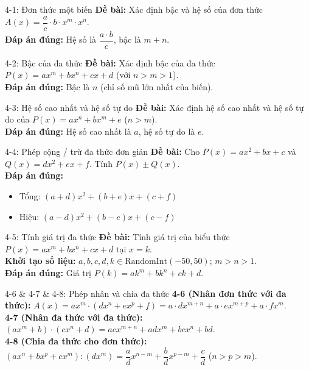 \documentclass[11pt, a4paper]{article}
\begin{document}
\begin{qbox}{4-1: Đơn thức một biến}
\textbf{Đề bài:} Xác định bậc và hệ số của đơn thức $A(x) = \dfrac{a}{c} \cdot b \cdot x^m \cdot x^n$. \\[0.3em]
\textbf{Đáp án đúng:} Hệ số là $\dfrac{a \cdot b}{c}$, bậc là $m + n$.
\end{qbox}

\begin{qbox}{4-2: Bậc của đa thức}
\textbf{Đề bài:} Xác định bậc của đa thức $P(x) = a x^m + b x^n + c x + d$ (với $n > m > 1$). \\[0.3em]
\textbf{Đáp án đúng:} Bậc là $n$ (chỉ số mũ lớn nhất của biến).
\end{qbox}

\begin{qbox}{4-3: Hệ số cao nhất và hệ số tự do}
\textbf{Đề bài:} Xác định hệ số cao nhất và hệ số tự do của $P(x) = a x^n + b x^m + e$ ($n > m$). \\[0.3em]
\textbf{Đáp án đúng:} Hệ số cao nhất là $a$, hệ số tự do là $e$.
\end{qbox}

\begin{qbox}{4-4: Phép cộng / trừ đa thức đơn giản}
\textbf{Đề bài:} Cho $P(x) = a x^2 + b x + c$ và $Q(x) = d x^2 + e x + f$. Tính $P(x) \pm Q(x)$. \\[0.3em]
\textbf{Đáp án đúng:} 
\begin{itemize}[leftmargin=1.5em, topsep=2pt, itemsep=2pt]
    \item Tổng: $(a+d)x^2 + (b+e)x + (c+f)$
    \item Hiệu: $(a-d)x^2 + (b-e)x + (c-f)$
\end{itemize}
\end{qbox}

\begin{qbox}{4-5: Tính giá trị đa thức}
\textbf{Đề bài:} Tính giá trị của biểu thức $P(x) = a x^m + b x^n + c x + d$ tại $x = k$. \\[0.3em]
\textbf{Khởi tạo số liệu:} $a, b, c, d, k \in \text{RandomInt}(-50, 50)$; $m > n > 1$. \\[0.3em]
\textbf{Đáp án đúng:} Giá trị $P(k) = a k^m + b k^n + c k + d$.
\end{qbox}

\begin{qbox}{4-6 \& 4-7 \& 4-8: Phép nhân và chia đa thức}
\textbf{4-6 (Nhân đơn thức với đa thức):} $A(x) = a x^m \cdot (d x^n + e x^p + f) = a\cdot d x^{m+n} + a\cdot e x^{m+p} + a\cdot f x^m$. \\[0.3em]
\textbf{4-7 (Nhân đa thức với đa thức):} $(a x^m + b) \cdot (c x^n + d) = a c x^{m+n} + a d x^m + b c x^n + b d$. \\[0.3em]
\textbf{4-8 (Chia đa thức cho đơn thức):} $(a x^n + b x^p + c x^m) : (d x^m) = \dfrac{a}{d} x^{n-m} + \dfrac{b}{d} x^{p-m} + \dfrac{c}{d}$ ($n > p > m$).
\end{qbox}
\end{document}
